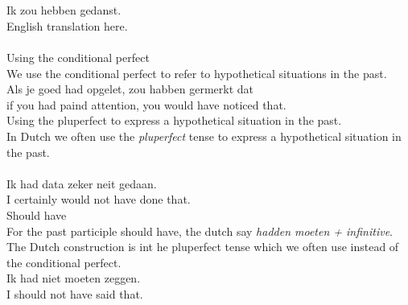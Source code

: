 \documentclass[letterpaper,11pt]{article}
\begin{document}
\\
\\
Ik zou hebben gedanst. \\
English translation here. \\
\\
Using the conditional perfect \\
We use the conditional perfect to refer to hypothetical situations in the past.  \\
Als je goed had opgelet, zou habben germerkt dat \\
if you had paind attention, you would have noticed that. \\
Using the pluperfect to express a hypothetical situation in the past. \\
In Dutch we often use the \textit{pluperfect} tense to express a hypothetical
situation in the past. \\
  \\
Ik had data zeker neit gedaan. \\
I certainly would not have done that. \\
Should have \\
For the past participle should have, the dutch say \textit{hadden moeten +
infinitive}. The Dutch construction is int he pluperfect tense which we often
use instead of the conditional perfect. \\
Ik had niet moeten zeggen. \\
I should not have said that. \\
\end{document}
